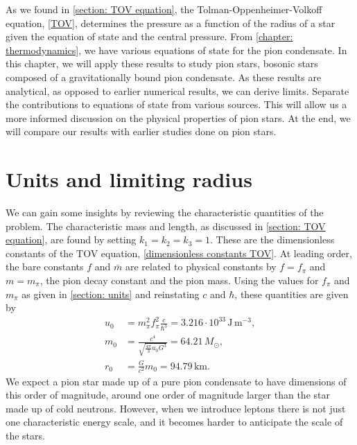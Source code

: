 As we found in \autoref{section: TOV equation}, the Tolman-Oppenheimer-Volkoff equation, \autoref{TOV}, determines the pressure as a function of the radius of a star given the equation of state and the central pressure.
From \autoref{chapter: thermodynamics}, we have various equations of state for the pion condensate.
In this chapter, we will apply these results to study pion stars, bosonic stars composed of a gravitationally bound pion condensate.
As these results are analytical, as opposed to earlier numerical results, we can derive limits. 
Separate the contributions to equations of state from various sources.
This will allow us a more informed discussion on the physical properties of pion stars.
At the end, we will compare our results with earlier studies done on pion stars.


\section{Units and limiting radius}

We can gain some insights by reviewing the characteristic quantities of the problem.
The characteristic mass and length, as discussed in \autoref{section: TOV equation}, are found by setting $k_1 = k_2 = k_3 = 1$.
These are the dimensionless constants of the TOV equation, \autoref{dimensionless constants TOV}.
At leading order, the bare constants $f$ and $\bar m$ are related to physical constants by $f = f_\pi$ and $m = m_\pi$, the pion decay constant and the pion mass.
Using the values for $f_\pi$ and $m_\pi$ as given in \autoref{section: units} and reinstating $c$ and $\hbar$, these quantities are given by
%
\begin{align}
    u_0 & =m_\pi^2 f_\pi^2 \frac{c}{\hbar^3}
    = 3.216\cdot 10^{33} \, \text{J}\,\text{m}^{-3}, \\
    m_0 & = \frac{c^4}{\sqrt{\frac{4 \pi}{ 3} u_0 G^3}} = 64.21\, M_\odot, \\
    r_0 & = \frac{G}{c^2} m_0 = 94.79 \, \text{km}.
\end{align}
%
We expect a pion star made up of a pure pion condensate to have dimensions of this order of magnitude, around one order of magnitude larger than the star made up of cold neutrons.
However, when we introduce leptons there is not just one characteristic energy scale, and it becomes harder to anticipate the scale of the stars.



